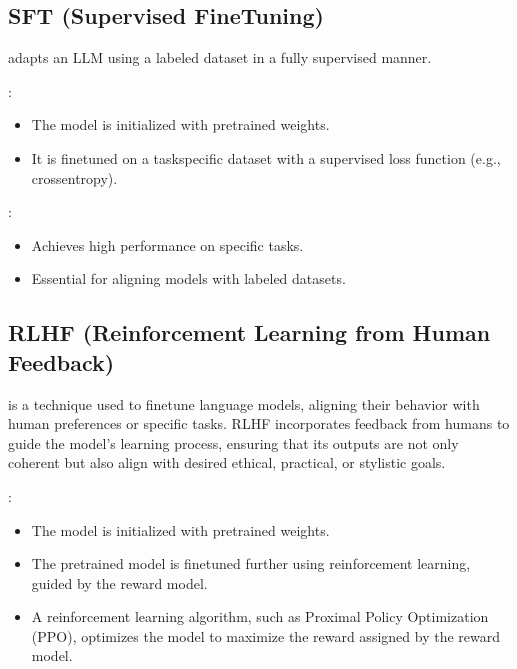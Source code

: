 \documentclass[letterpaper,11pt,english]{sphinxmanual}
\begin{document}
\subsection{SFT (Supervised Fine\sphinxhyphen{}Tuning)}
\label{\detokenize{finetuning:sft-supervised-fine-tuning}}
\sphinxAtStartPar
{} adapts an LLM using a labeled dataset in a fully supervised manner.

\sphinxAtStartPar
{}:
\begin{itemize}
\item {} 
\sphinxAtStartPar
The model is initialized with pre\sphinxhyphen{}trained weights.

\item {} 
\sphinxAtStartPar
It is fine\sphinxhyphen{}tuned on a task\sphinxhyphen{}specific dataset with a supervised loss function (e.g., cross\sphinxhyphen{}entropy).

\end{itemize}

\sphinxAtStartPar
{}:
\begin{itemize}
\item {} 
\sphinxAtStartPar
Achieves high performance on specific tasks.

\item {} 
\sphinxAtStartPar
Essential for aligning models with labeled datasets.

\end{itemize}


\subsection{RLHF (Reinforcement Learning from Human Feedback)}
\label{\detokenize{finetuning:rlhf-reinforcement-learning-from-human-feedback}}
\sphinxAtStartPar
{} is a technique used to fine\sphinxhyphen{}tune language models, aligning their
behavior with human preferences or specific tasks. RLHF incorporates feedback
from humans to guide the model’s learning process, ensuring that its outputs
are not only coherent but also align with desired ethical, practical, or
stylistic goals.

\sphinxAtStartPar
{}:
\begin{itemize}
\item {} 
\sphinxAtStartPar
The model is initialized with pre\sphinxhyphen{}trained weights.

\item {} 
\sphinxAtStartPar
The pretrained model is fine\sphinxhyphen{}tuned further using reinforcement learning,
guided by the reward model.

\item {} 
\sphinxAtStartPar
A reinforcement learning algorithm, such as Proximal Policy Optimization
(PPO), optimizes the model to maximize the reward assigned by the reward model.

\end{itemize}
\end{document}
